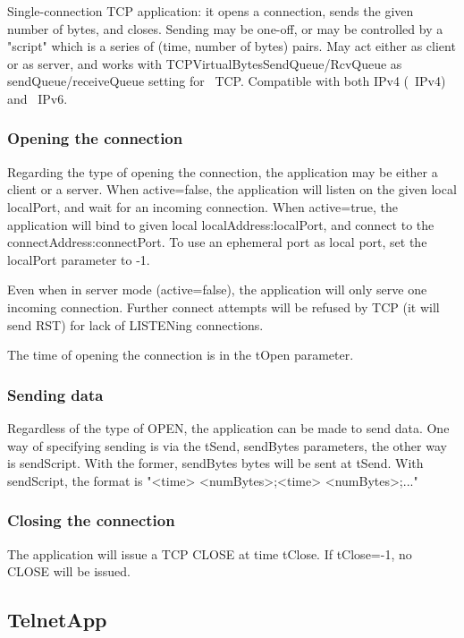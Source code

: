 Single-connection TCP application: it opens a connection, sends
the given number of bytes, and closes. Sending may be one-off,
or may be controlled by a "script" which is a series of
(time, number of bytes) pairs. May act either as client or as server,
and works with TCPVirtualBytesSendQueue/RcvQueue as sendQueue/receiveQueue
setting for ~TCP.
Compatible with both IPv4 (~IPv4) and ~IPv6.

\subsubsection*{Opening the connection}

Regarding the type of opening the connection, the application may
be either a client or a server. When active=false, the application
will listen on the given local localPort, and wait for an incoming connection.
When active=true, the application will bind to given local localAddress:localPort,
and connect to the connectAddress:connectPort. To use an ephemeral port
as local port, set the localPort parameter to -1.

Even when in server mode (active=false), the application will only
serve one incoming connection. Further connect attempts will be
refused by TCP (it will send RST) for lack of LISTENing connections.

The time of opening the connection is in the tOpen parameter.

\subsubsection*{Sending data}

Regardless of the type of OPEN, the application can be made to send
data. One way of specifying sending is via the tSend, sendBytes
parameters, the other way is sendScript. With the former, sendBytes
bytes will be sent at tSend. With sendScript, the format is
"<time> <numBytes>;<time> <numBytes>;..."

\subsubsection*{Closing the connection}

The application will issue a TCP CLOSE at time tClose. If tClose=-1, no
CLOSE will be issued.



\subsection{TelnetApp}


